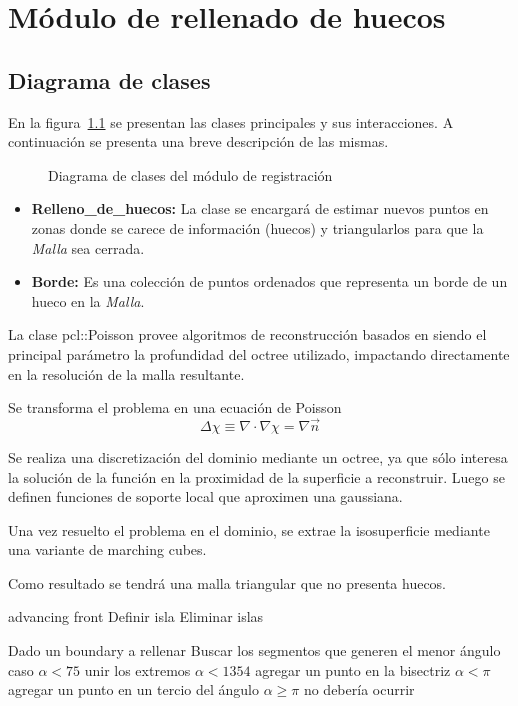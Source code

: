 \chapter{Módulo de rellenado de huecos}

	\section{Diagrama de clases}
		En la figura~\ref{fig:filling_class} se presentan las clases principales y sus interacciones.
		A continuación se presenta una breve descripción de las mismas.
		\begin{figure}
			\caption{\label{fig:filling_class}Diagrama de clases del módulo de registración}
		\end{figure}

		\begin{itemize}
			\item {\bfseries Relleno\_de\_huecos:} La clase se encargará de estimar
				nuevos puntos en zonas donde se carece de información (huecos)
				y triangularlos para que la \emph{Malla} sea cerrada.
			\item {\bfseries Borde:} Es una colección de puntos ordenados
				que representa un borde de un hueco en la \emph{Malla}.
		\end{itemize}

	La clase pcl::Poisson provee algoritmos de reconstrucción basados en %
	siendo el principal parámetro la profundidad del octree utilizado,
	impactando directamente en la resolución de la malla resultante.


	Se transforma el problema en una ecuación de Poisson
	\[\Delta\chi \equiv \nabla \cdot\nabla\chi = \nabla \vec{n}\]

	Se realiza una discretización del dominio mediante un octree, ya que sólo
	interesa la solución de la función en la proximidad de la superficie a
	reconstruir.
	Luego se definen funciones de soporte local que aproximen una gaussiana.

	Una vez resuelto el problema en el dominio, se extrae la isosuperficie mediante una variante de marching cubes.

	Como resultado se tendrá una malla triangular que no presenta huecos.


	advancing front
	Definir isla
	Eliminar islas

	Dado un boundary a rellenar
		Buscar los segmentos que generen el menor ángulo
		caso $\alpha < 75$
			unir los extremos
		$\alpha < 1354$
			agregar un punto en la bisectriz
		$\alpha < \pi$
			agregar un punto en un tercio del ángulo
		$\alpha \geq \pi$
			no debería ocurrir

